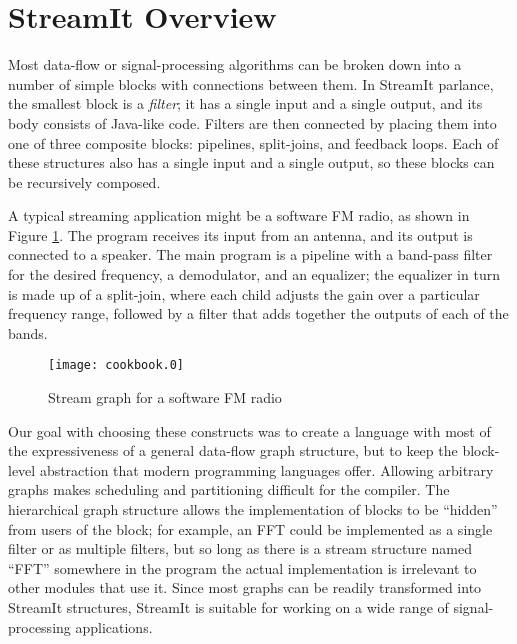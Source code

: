 \section{StreamIt Overview}

Most data-flow or signal-processing algorithms can be broken down into
a number of simple blocks with connections between them.  In StreamIt
parlance, the smallest block is a \emph{filter}; it has a single input
and a single output, and its body consists of Java-like code.  Filters
are then connected by placing them into one of three composite blocks:
pipelines, split-joins, and feedback loops.  Each of these structures
also has a single input and a single output, so these blocks can be
recursively composed.

A typical streaming application might be a software FM radio, as shown
in Figure \ref{fig:fmradio}.  The program receives its input from an
antenna, and its output is connected to a speaker.  The main program
is a pipeline with a band-pass filter for the desired frequency, a
demodulator, and an equalizer; the equalizer in turn is made up of a
split-join, where each child adjusts the gain over a particular
frequency range, followed by a filter that adds together the outputs
of each of the bands.

\begin{figure}[htbp]
  \begin{center}
    \texttt{[image: cookbook.0]}
    \caption{Stream graph for a software FM radio}
    \label{fig:fmradio}
  \end{center}
\end{figure}

Our goal with choosing these constructs was to create a language with
most of the expressiveness of a general data-flow graph structure, but
to keep the block-level abstraction that modern programming languages
offer.  Allowing arbitrary graphs makes scheduling and partitioning
difficult for the compiler.  The hierarchical graph structure allows
the implementation of blocks to be ``hidden'' from users of the block;
for example, an FFT could be implemented as a single filter or as
multiple filters, but so long as there is a stream structure named
``FFT'' somewhere in the program the actual implementation is
irrelevant to other modules that use it.  Since most graphs can be
readily transformed into StreamIt structures, StreamIt is suitable for
working on a wide range of signal-processing applications.


